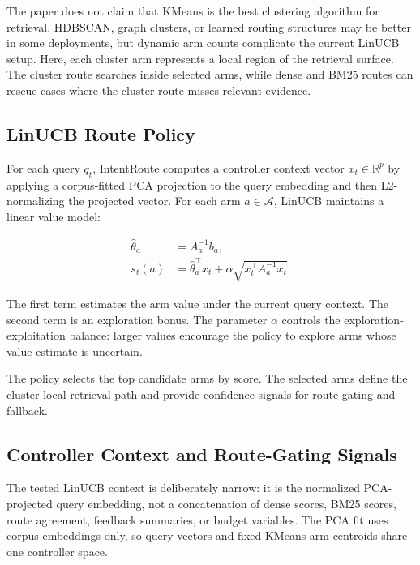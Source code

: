 The paper does not claim that KMeans is the best clustering algorithm for retrieval. HDBSCAN, graph clusters, or learned routing structures may be better in some deployments, but dynamic arm counts complicate the current LinUCB setup. Here, each cluster arm represents a local region of the retrieval surface. The cluster route searches inside selected arms, while dense and BM25 routes can rescue cases where the cluster route misses relevant evidence.

\subsection{LinUCB Route Policy}
\label{sec:04-method:linucb-route-policy}

For each query $q_t$, IntentRoute computes a controller context vector $x_t \in \mathbb{R}^{p}$ by applying a corpus-fitted PCA projection to the query embedding and then L2-normalizing the projected vector. For each arm $a \in \mathcal{A}$, LinUCB maintains a linear value model:

\[
\begin{aligned}
\hat{\theta}_a &= A_a^{-1} b_a, \\
s_t(a) &= \hat{\theta}_a^\top x_t
        + \alpha \sqrt{x_t^\top A_a^{-1} x_t}.
\end{aligned}
\]

The first term estimates the arm value under the current query context. The second term is an exploration bonus. The parameter $\alpha$ controls the exploration-exploitation balance: larger values encourage the policy to explore arms whose value estimate is uncertain.

The policy selects the top candidate arms by score. The selected arms define the cluster-local retrieval path and provide confidence signals for route gating and fallback.

\subsection{Controller Context and Route-Gating Signals}
\label{sec:04-method:controller-context-and-route-gating-signals}

The tested LinUCB context is deliberately narrow: it is the normalized PCA-projected query embedding, not a concatenation of dense scores, BM25 scores, route agreement, feedback summaries, or budget variables. The PCA fit uses corpus embeddings only, so query vectors and fixed KMeans arm centroids share one controller space.


